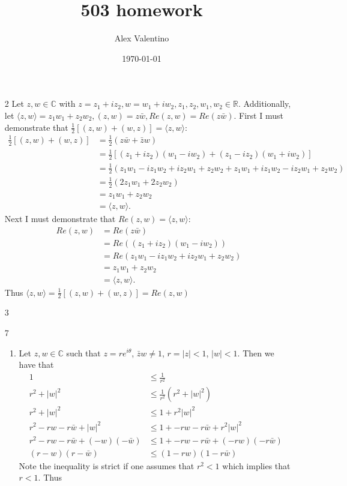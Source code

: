 \documentclass[12pt, letterpaper]{article}
\date{\today}
\author{Alex Valentino}
\title{503 homework}
\newcommand{\R}{\mathbb{R}}
\newcommand{\C}{\mathbb{C}}
\begin{document}
\begin{enumerate}
	\item[2] Let $z,w \in \C$ with $z = z_1 + i z_2, w = w_1 + i w_2, z_1, z_2, w_1, w_2 \in \R$.  Additionally, let 
	$\langle z,w \rangle = z_1 w_1 + z_2 w_2, (z,w) = z \bar{w}, Re(z,w) = Re(z \bar{w} ) $.  First I must demonstrate that 
	$\frac{1}{2}[(z,w) + (w,z)] =  \langle z,w \rangle$:
	\begin{align*}
		\frac{1}{2}[(z,w) + (w,z)] &= \frac{1}{2} (z \bar{w} + \bar{z} w)\\
		&= \frac{1}{2} [(z_1 + i z_2)(w_1 - i w_2) + (z_1 - i z_2)(w_1 + i w_2)]\\
		&= \frac{1}{2} (z_1 w_1 - i z_1 w_2 + i z_2 w_1 + z_2 w_2 + z_1 w_1 + i z_1 w_2 - i z_2 w_1 + z_2 w_2)\\
		&= \frac{1}{2} (2 z_1 w_1 + 2 z_2 w_2)\\
		&= z_1 w_1 + z_2 w_2\\
		&= \langle z,w \rangle.
	\end{align*}
	Next I must demonstrate that $Re(z,w) =\langle z,w \rangle $:
	\begin{align*}
		Re(z,w) &= Re(z\bar{w})\\
		&= Re((z_1 + iz_2)(w_1 - i w_2))\\
		&= Re(z_1 w_1 - i z_1 w_2 + i z_2 w_1 + z_2 w_2)\\
		&= z_1 w_1 + z_2 w_2\\
		&= \langle z,w \rangle.
	\end{align*}
	Thus $\langle z,w \rangle = \frac{1}{2}[(z,w) + (w,z)] = Re(z,w)$
	\item[3]
	\item[7]
	\begin{enumerate}
		\item Let $z,w \in \C$ such that $z = re^{i \theta}$, $\bar{z}w \neq 1$, $r = |z| < 1$, $|w| < 1$.  Then we have that 
		\begin{align*}
			1 &\leq \frac{1}{r^2}\\
			r^2 + |w|^2 &\leq \frac{1}{r^2}(r^2 + |w|^2)\\
			r^2 + |w|^2 &\leq  1 + r^2 |w|^2\\
			r^2 - rw - r\bar{w} +  |w|^2 & \leq 1 +- rw - r\bar{w} +  r^2 |w|^2\\
			r^2 - rw - r\bar{w} + (-w) (-\bar{w}) & \leq 1 +- rw - r \bar{w} +  (-r w)(-r \bar{w})\\
			(r - w)(r- \bar{w}) & \leq (1 - rw)(1 - r \bar{w})						
		\end{align*}
		Note the inequality is strict if one assumes that $r^2 < 1$ which implies that $r < 1$.   Thus 

\end{enumerate}
\end{enumerate}
\end{document}
